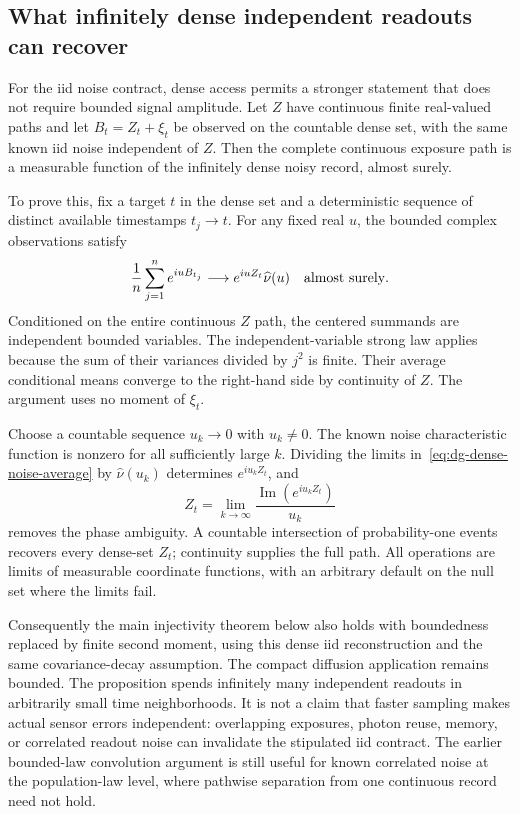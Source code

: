 \subsection{What infinitely dense independent readouts can recover}

For the iid noise contract, dense access permits a stronger statement that
does not require bounded signal amplitude. Let $Z$ have continuous finite
real-valued paths and let $B_t=Z_t+\xi_t$ be observed on the countable dense
set, with the same known iid noise independent of $Z$. Then the complete
continuous exposure path is a measurable function of the infinitely dense
noisy record, almost surely.

To prove this, fix a target $t$ in the dense set and a deterministic sequence
of distinct available timestamps $t_j\to t$. For any fixed real $u$, the
bounded complex observations satisfy
\begin{equation}
 \frac1n\sum_{j=1}^n e^{iuB_{t_j}}
 \longrightarrow e^{iuZ_t}\widehat\nu(u)
 \quad\hbox{almost surely}.
 \label{eq:dg-dense-noise-average}
\end{equation}
Conditioned on the entire continuous $Z$ path, the centered summands are
independent bounded variables. The independent-variable strong law applies
because the sum of their variances divided by $j^2$ is finite. Their average
conditional means converge to the right-hand side by continuity of $Z$.
The argument uses no moment of $\xi_t$.

Choose a countable sequence $u_k\to0$ with $u_k\ne0$. The known noise
characteristic function is nonzero for all sufficiently large $k$.
Dividing the limits in~\eqref{eq:dg-dense-noise-average} by
$\widehat\nu(u_k)$ determines $e^{iu_kZ_t}$, and
\[
 Z_t=\lim_{k\to\infty}
       \frac{\operatorname{Im}(e^{iu_kZ_t})}{u_k}
\]
removes the phase ambiguity. A countable intersection of probability-one
events recovers every dense-set $Z_t$; continuity supplies the full path.
All operations are limits of measurable coordinate functions, with an
arbitrary default on the null set where the limits fail.

Consequently the main injectivity theorem below also holds with boundedness
replaced by finite second moment, using this dense iid reconstruction and
the same covariance-decay assumption. The compact diffusion application
remains bounded. The proposition spends infinitely many independent
readouts in arbitrarily small time neighborhoods. It is not a claim that
faster sampling makes actual sensor errors independent: overlapping
exposures, photon reuse, memory, or correlated readout noise can invalidate
the stipulated iid contract. The earlier bounded-law convolution argument
is still useful for known correlated noise at the population-law level,
where pathwise separation from one continuous record need not hold.


